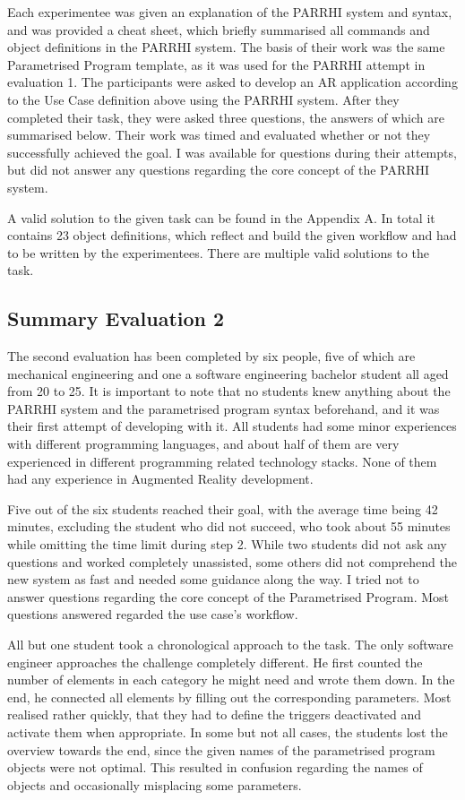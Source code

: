 \FloatBarrier

Each experimentee was given an explanation of the PARRHI system and syntax, and was provided a cheat sheet, which briefly summarised all commands and object definitions in the PARRHI system. The basis of their work was the same Parametrised Program template, as it was used for the PARRHI attempt in evaluation 1. The participants were asked to develop an AR application according to the Use Case definition above using the PARRHI system. After they completed their task, they were asked three questions, the answers of which are summarised below. Their work was timed and evaluated whether or not they successfully achieved the goal. I was available for questions during their attempts, but did not answer any questions regarding the core concept of the PARRHI system. 

A valid solution to the given task can be found in the Appendix A. In total it contains 23 object definitions, which reflect and build the given workflow and had to be written by the experimentees. There are multiple valid solutions to the task.

\subsection{Summary Evaluation 2}

The second evaluation has been completed by six people, five of which are mechanical engineering and one a software engineering bachelor student all aged from 20 to 25. It is important to note that no students knew anything about the PARRHI system and the parametrised program syntax beforehand, and it was their first attempt of developing with it. All students had some minor experiences with different programming languages, and about half of them are very experienced in different programming related technology stacks. None of them had any experience in Augmented Reality development.

Five out of the six students reached their goal, with the average time being 42 minutes, excluding the student who did not succeed, who took about 55 minutes while omitting the time limit during step 2. While two students did not ask any questions and worked completely unassisted, some others did not comprehend the new system as fast and needed some guidance along the way. I tried not to answer questions regarding the core concept of the Parametrised Program. Most questions answered regarded the use case's workflow.

All but one student took a chronological approach to the task. The only software engineer approaches the challenge completely different. He first counted the number of elements in each category he might need and wrote them down. In the end, he connected all elements by filling out the corresponding parameters. Most realised rather quickly, that they had to define the triggers deactivated and activate them when appropriate. In some but not all cases, the students lost the overview towards the end, since the given names of the parametrised program objects were not optimal. This resulted in confusion regarding the names of objects and occasionally misplacing some parameters.


